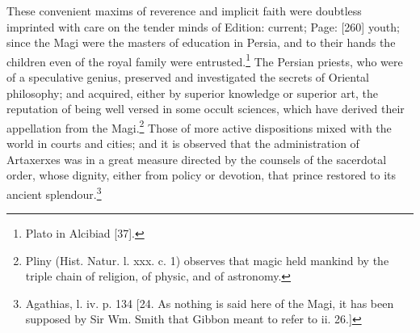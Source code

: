 These convenient maxims of reverence and implicit faith were doubtless imprinted with care on the tender minds of Edition: current; Page: [260] youth; since the Magi were the masters of education in Persia, and to their hands the children even of the royal family were entrusted.\footnote{Plato in Alcibiad [37].} The Persian priests, who were of a speculative genius, preserved and investigated the secrets of Oriental philosophy; and acquired, either by superior knowledge or superior art, the reputation of being well versed in some occult sciences, which have derived their appellation from the Magi.\footnote{Pliny (Hist. Natur. l. xxx. c. 1) observes that magic held mankind by the triple chain of religion, of physic, and of astronomy.} Those of more active dispositions mixed with the world in courts and cities; and it is observed that the administration of Artaxerxes was in a great measure directed by the counsels of the sacerdotal order, whose dignity, either from policy or devotion, that prince restored to its ancient splendour.\footnote{Agathias, l. iv. p. 134 [24. As nothing is said here of the Magi, it has been supposed by Sir Wm. Smith that Gibbon meant to refer to ii. 26.]}

